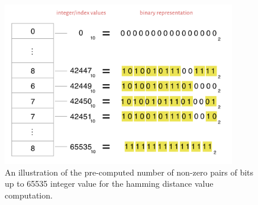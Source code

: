\begin{figure}[h]
	\centering
	\includegraphics[width=4.0in]{contents/00_images/pre-computed-hd-values}\vspace*{5pt}
	
	\caption{An illustration of the pre-computed number of non-zero pairs of bits up to 65535 integer value for the hamming distance value computation.}
	\label{fig:pre-computed-hd}
\end{figure}